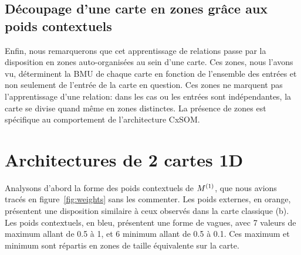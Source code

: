 \documentclass[../main]{subfiles}
\begin{document}
\subsection{Découpage d'une carte en zones grâce aux poids contextuels}

Enfin, nous remarquerons que cet apprentissage de relations passe par la disposition en zones auto-organisées au sein d'une carte. Ces zones, nous l'avons vu, déterminent la BMU de chaque carte en fonction de l'ensemble des entrées et non seulement de l'entrée de la carte en question. Ces zones ne marquent pas l'apprentissage d'une relation: dans les cas ou les entrées sont indépendantes, la carte se divise quand même en zones distinctes. La présence de zones est spécifique au comportement de l'architecture CxSOM.

\section{Architectures de 2 cartes 1D}

Analysons d'abord la forme des poids contextuels de $M^{({1})}$, que nous avions tracés en figure~\ref{fig:weights} sans les commenter. Les poids externes, en orange, présentent une disposition similaire à ceux observés dans la carte classique (b). Les poids contextuels, en bleu, présentent une forme de vagues, avec 7 valeurs de maximum allant de 0.5 à 1, et 6 minimum allant de 0.5 à 0.1. Ces maximum et minimum sont répartis en zones de taille équivalente sur la carte. 
\end{document}
